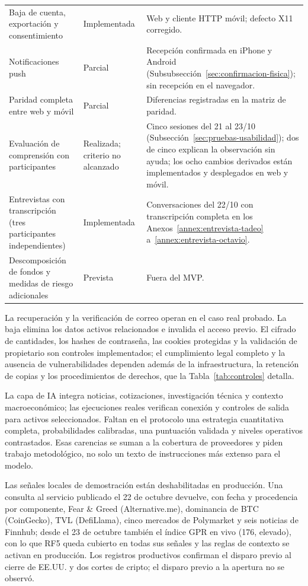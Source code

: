 \begin{table}[ht]
\begin{tabular}{>{\raggedright\arraybackslash}p{5.2cm}>{\raggedright\arraybackslash}p{2.1cm}>{\raggedright\arraybackslash}p{6.3cm}}
Baja de cuenta, exportación y consentimiento & Implementada & Web y cliente HTTP móvil; defecto X11 corregido.\\
Notificaciones push & Parcial & Recepción confirmada en iPhone y Android (Subsubsección~\ref{sec:confirmacion-fisica}); sin recepción en el navegador.\\
Paridad completa entre web y móvil & Parcial & Diferencias registradas en la matriz de paridad.\\
Evaluación de comprensión con participantes & Realizada; criterio no alcanzado & Cinco sesiones del 21 al 23/10 (Subsección~\ref{sec:pruebas-usabilidad}); dos de cinco explican la observación sin ayuda; los ocho cambios derivados están implementados y desplegados en web y móvil.\\
Entrevistas con transcripción (tres participantes independientes) & Implementada & Conversaciones del 22/10 con transcripción completa en los Anexos~\ref{annex:entrevista-tadeo} a~\ref{annex:entrevista-octavio}.\\
Descomposición de fondos y medidas de riesgo adicionales & Prevista & Fuera del MVP.\\\hline
\end{tabular}
\end{table}

La recuperación y la verificación de correo operan en el caso real probado. La baja elimina los datos activos relacionados e invalida el acceso previo. El cifrado de cantidades, los hashes de contraseña, las cookies protegidas y la validación de propietario son controles implementados; el cumplimiento legal completo y la ausencia de vulnerabilidades dependen además de la infraestructura, la retención de copias y los procedimientos de derechos, que la Tabla~\ref{tab:controles} detalla.

La capa de IA integra noticias, cotizaciones, investigación técnica y contexto macroeconómico; las ejecuciones reales verifican conexión y controles de salida para activos seleccionados. Faltan en el protocolo una estrategia cuantitativa completa, probabilidades calibradas, una puntuación validada y niveles operativos contrastados. Esas carencias se suman a la cobertura de proveedores y piden trabajo metodológico, no solo un texto de instrucciones más extenso para el modelo.

Las señales locales de demostración están deshabilitadas en producción. Una consulta al servicio publicado el 22 de octubre devuelve, con fecha y procedencia por componente, Fear \& Greed (Alternative.me), dominancia de BTC (CoinGecko), TVL (DefiLlama), cinco mercados de Polymarket y seis noticias de Finnhub; desde el 23 de octubre también el índice GPR en vivo (176, elevado), con lo que RF5 queda cubierto en todas sus señales y las reglas de contexto se activan en producción. Los registros productivos confirman el disparo previo al cierre de EE.UU. y dos cortes de cripto; el disparo previo a la apertura no se observó.

